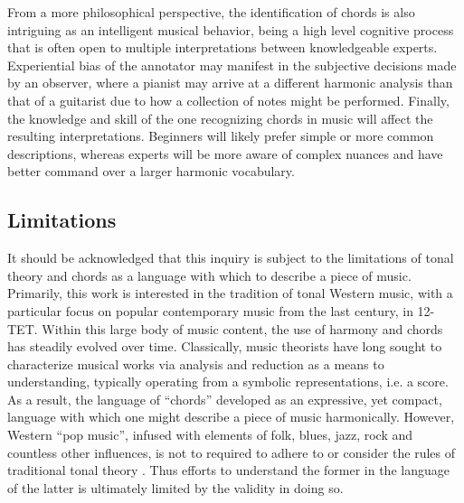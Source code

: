 From a more philosophical perspective, the identification of chords is also intriguing as an intelligent musical behavior, being a high level cognitive process that is often open to multiple interpretations between knowledgeable experts.
Experiential bias of the annotator may manifest in the subjective decisions made by an observer, where a pianist may arrive at a different harmonic analysis than that of a guitarist due to how a collection of notes might be performed.
Finally, the knowledge and skill of the one recognizing chords in music will affect the resulting interpretations.
Beginners will likely prefer simple or more common descriptions, whereas experts will be more aware of complex nuances and have better command over a larger harmonic vocabulary.


\subsection{Limitations}
\label{subsec:limitations}

It should be acknowledged that this inquiry is subject to the limitations of tonal theory and chords as a language with which to describe a piece of music.
Primarily, this work is interested in the tradition of tonal Western music, with a particular focus on popular contemporary music from the last century, in 12-TET.
Within this large body of music content, the use of harmony and chords has steadily evolved over time.
Classically, music theorists have long sought to characterize musical works via analysis and reduction as a means to understanding, typically operating from a symbolic representations, i.e. a score.
As a result, the language of ``chords'' developed as an expressive, yet compact, language with which one might describe a piece of music harmonically.
However, Western ``pop music'', infused with elements of folk, blues, jazz, rock and countless other influences, is not to required to adhere to or consider the rules of traditional tonal theory \cite{Tagg1982Analysing}.
Thus efforts to understand the former in the language of the latter is ultimately limited by the validity in doing so.

